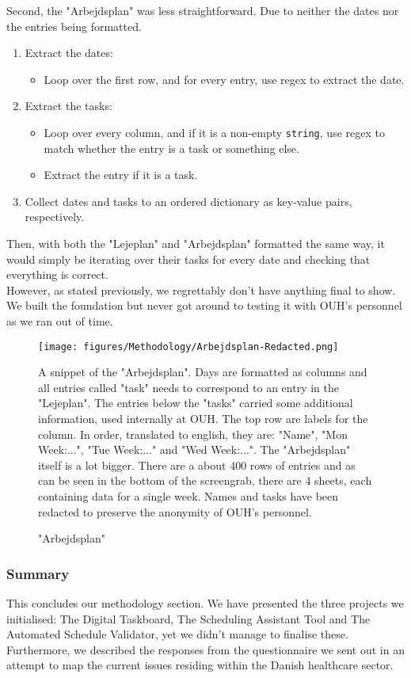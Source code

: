 \newpage
Second, the "Arbejdsplan" was less straightforward. Due to neither the dates nor the entries being formatted. 
\begin{enumerate}
	\item Extract the dates:
		\begin{itemize}
			\item Loop over the first row, and for every entry, use regex to extract the date.	
		\end{itemize}
	\item Extract the tasks:
		\begin{itemize}
			\item Loop over every column, and if it is a non-empty \texttt{string}, use regex to match whether the entry is a task or something else.
			\item Extract the entry if it is a task.	
		\end{itemize}
	\item Collect dates and tasks to an ordered \gls{dictionary} as key-value pairs, respectively.
\end{enumerate}
Then, with both the "Lejeplan" and "Arbejdsplan" formatted the same way, it would simply be iterating over their tasks for every date and checking that everything is correct.
\\
However, as stated previously, we regrettably don't have anything final to show. We built the foundation but never got around to testing it with OUH's personnel as we ran out of time.     
\begin{figure}[H]
    \centering
    \texttt{[image: figures/Methodology/Arbejdsplan-Redacted.png]}
    \caption{"Arbejdsplan"}
    \small
    \raggedright 
    A snippet of the "Arbejdsplan". Days are formatted as columns and all entries called "task" needs to correspond to an entry in the "Lejeplan". The entries below the "tasks" carried some additional information, used internally at OUH. The top row are labels for the column. In order, translated to english, they are: "Name", "Mon Week:...", "Tue Week:..." and "Wed Week:...". The "Arbejdsplan" itself is a lot bigger. There are a about \(400\) rows of entries and as can be seen in the bottom of the screengrab, there are 4 sheets, each containing data for a single week. Names and tasks have been redacted to preserve the anonymity of OUH's personnel.
    \label{fig:Arbejdsplan}
\end{figure}

\subsubsection*{Summary}
This concludes our methodology section. We have presented the three projects we initialised: The Digital Taskboard, The Scheduling Assistant Tool and The Automated Schedule Validator, yet we didn't manage to finalise these.
\\
Furthermore, we described the responses from the questionnaire we sent out in an attempt to map the current issues residing within the Danish healthcare sector.